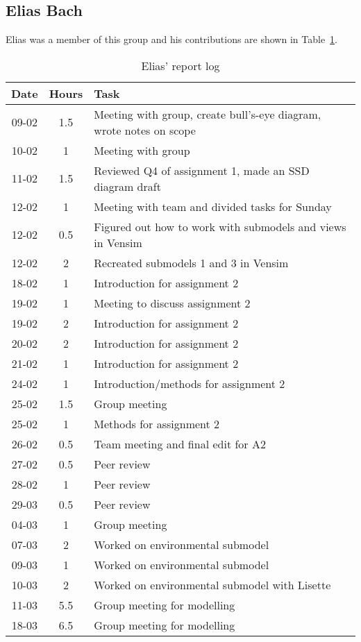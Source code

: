\subsection{Elias Bach}
Elias was a member of this group and his contributions are shown in Table~\ref{tab:elias_log}. 
\begin{longtable}[c]{c|c|m{35em}}
\caption{Elias' report log}
\label{tab:elias_log}\\
\textbf{Date}& \textbf{Hours} & \textbf{Task} \\
\hline
\endfirsthead
%
\endhead
%
09-02 & 1.5 & Meeting with group, create bull's-eye diagram, wrote notes on scope\\
10-02 & 1 & Meeting with group \\
11-02 & 1.5 & Reviewed Q4 of assignment 1, made an SSD diagram draft \\
12-02 & 1 & Meeting with team and divided tasks for Sunday\\ 
12-02 & 0.5 & Figured out how to work with submodels and views in Vensim \\
12-02 & 2 & Recreated submodels 1 and 3 in Vensim \\
18-02 & 1 & Introduction for assignment 2 \\
19-02 & 1 & Meeting to discuss assignment 2\\
19-02 & 2 & Introduction for assignment 2 \\
20-02 & 2 & Introduction for assignment 2 \\
21-02 & 1 & Introduction for assignment 2 \\
24-02 & 1 & Introduction/methods for assignment 2 \\
25-02 & 1.5 & Group meeting \\
25-02 & 1 & Methods for assignment 2 \\
26-02 & 0.5 & Team meeting and final edit for A2 \\
27-02 & 0.5 & Peer review \\
28-02 & 1 & Peer review \\
29-03 & 0.5 & Peer review \\
04-03 & 1 & Group meeting \\
07-03 & 2 & Worked on environmental submodel \\
09-03 & 1 & Worked on environmental submodel \\
10-03 & 2 & Worked on environmental submodel with Lisette \\
11-03 & 5.5 & Group meeting for modelling \\
18-03 & 6.5 & Group meeting for modelling \\

\end{longtable}
